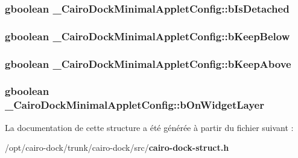 \subsubsection{\setlength{\rightskip}{0pt plus 5cm}gboolean {\bf \_\-CairoDockMinimalAppletConfig::bIsDetached}}\label{struct__CairoDockMinimalAppletConfig_9a033e90b3beb53cba20908ba60dbccf}


\subsubsection{\setlength{\rightskip}{0pt plus 5cm}gboolean {\bf \_\-CairoDockMinimalAppletConfig::bKeepBelow}}\label{struct__CairoDockMinimalAppletConfig_e94aded0c457e2cd56a94312a04d64d4}


\subsubsection{\setlength{\rightskip}{0pt plus 5cm}gboolean {\bf \_\-CairoDockMinimalAppletConfig::bKeepAbove}}\label{struct__CairoDockMinimalAppletConfig_ab5f7db7ef004196b783cd0c7b438295}


\subsubsection{\setlength{\rightskip}{0pt plus 5cm}gboolean {\bf \_\-CairoDockMinimalAppletConfig::bOnWidgetLayer}}\label{struct__CairoDockMinimalAppletConfig_7a838c17e3be052572d65c8a62c1c53e}




La documentation de cette structure a été générée à partir du fichier suivant :\begin{CompactItemize}
\item 
/opt/cairo-dock/trunk/cairo-dock/src/{\bf cairo-dock-struct.h}\end{CompactItemize}
